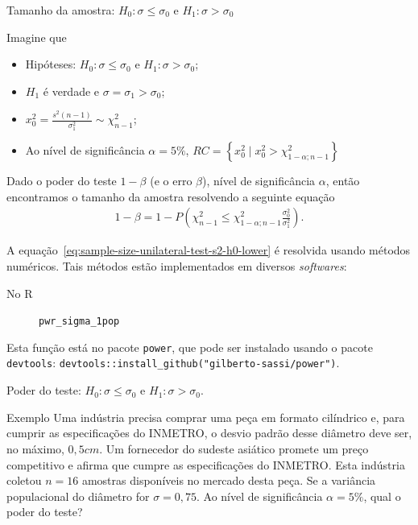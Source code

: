 \documentclass[8pt]{beamer}
\begin{document}
\begin{frame}{Tamanho da amostra: $H_0: \sigma \leq \sigma_0$ e $H_1: \sigma > \sigma_0$}

Imagine que
\begin{itemize}
\item Hipóteses: $H_0: \sigma \leq \sigma_0$ e $H_1: \sigma > \sigma_0$;
\item $H_1$ é verdade e $\sigma = \sigma_1 > \sigma_0$;
\item $x_0^2 = \frac{s^2(n-1)}{\sigma_1^2} \sim \chi_{n-1}^2$;
\item Ao nível de significância $\alpha=5\%$, $RC=\left\{ x_0^2 \mid x_0^2 > \chi_{1-\alpha; n-1}^2 \right\}$
\end{itemize}
\vfill

Dado o poder do teste $1-\beta$ (e o erro $\beta$), nível de significância $\alpha$, então encontramos o tamanho da amostra resolvendo a seguinte equação
\begin{align} \label{eq:sample-size-unilateral-test-s2-h0-lower}
1-\beta =1- P \left( \chi_{n-1}^2 \leq \chi_{1-\alpha; n-1}^2 \frac{\sigma_0^2}{\sigma_1^2} \right).
\end{align}

A equação~\eqref{eq:sample-size-unilateral-test-s2-h0-lower} é resolvida usando métodos numéricos. Tais métodos estão implementados em diversos \textit{softwares}:
\begin{description}
\item[No R] \lstinline|pwr_sigma_1pop|
\end{description}

Esta função está no pacote \lstinline|power|, que pode ser instalado usando o pacote \lstinline|devtools|: \lstinline|devtools::install_github("gilberto-sassi/power")|.
\end{frame}

\begin{frame}{Poder do teste: $H_0: \sigma \leq \sigma_0$ e $H_1: \sigma > \sigma_0$.}

\large

\begin{block}{Exemplo}
	Uma indústria precisa comprar uma peça em formato cilíndrico e, para cumprir as especificações do INMETRO, o desvio padrão desse diâmetro deve ser, no máximo, $0,5cm$. Um fornecedor do sudeste asiático promete um preço competitivo e afirma que cumpre as especificações do INMETRO. Esta indústria coletou $n=16$ amostras disponíveis no mercado desta peça. Se a variância populacional do diâmetro for $\sigma=0,75$. Ao nível de significância $\alpha=5\%$, qual o poder do teste?
\end{block}
\normalsize

\end{frame}
\end{document}
